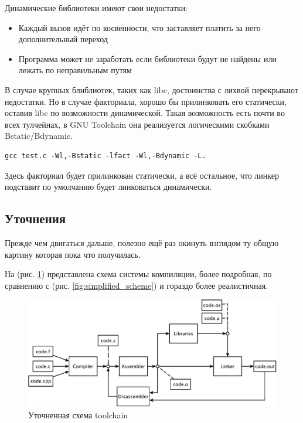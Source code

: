 \documentclass[a4paper,12pt,oneside]{article}
\begin{document}
Динамические библиотеки имеют свои недостатки:

\begin{itemize}
\item Каждый вызов идёт по косвенности, что заставляет платить за него дополнительный переход
\item Программа может не заработать если библиотеки будут не найдены или лежать по неправильным путям
\end{itemize}

В случае крупных блиблиотек, таких как libc, достоинства с лихвой перекрывают недостатки. Но в случае факториала, хорошо бы прилинковать его статически, оставив libc по возможности динамической. Такая возможность есть почти во всех тулчейнах, в GNU Toolchain она реализуется логическими скобками Bstatic/Bdynamic.

\begin{verbatim}
gcc test.c -Wl,-Bstatic -lfact -Wl,-Bdynamic -L.
\end{verbatim}

Здесь факториал будет прилинкован статически, а всё остальное, что линкер подставит по умолчанию будет линковаться динамически.

\pagebreak
\subsection{Уточнения}\label{subsec:Amendments}

Прежде чем двигаться дальше, полезно ещё раз окинуть взглядом ту общую картину которая пока что получилась.

На (рис. \ref{fig:toolchain_completed}) представлена схема системы компиляции, более подробная, по сравнению с (рис. \ref{fig:simplified_scheme}) и гораздо более реалистичная.

\begin{figure}[ht]
\centering
\includegraphics[width=1.0\textwidth]{illustrations/mipt-scheme-crop.pdf}
\caption{Уточненная схема toolchain}
\label{fig:toolchain_completed}
\end{figure}
\end{document}
